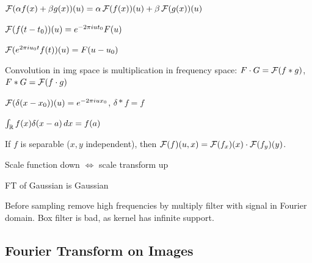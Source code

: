\begin{definition}[Lin.]
  \(\operatorname{\mathcal{F}}(\alpha f(x) + \beta g(x))(u) = \alpha \operatorname{\mathcal{F}}(f(x))(u) + \beta \operatorname{\mathcal{F}}(g(x))(u)\)
\end{definition}

\begin{definition}
  \(\operatorname{\mathcal{F}}(f(t - t_0))(u) = e^{-2 \pi iut_0 } F(u)\)
\end{definition}

\begin{definition}
  \(\operatorname{\mathcal{F}}(e^{2 \pi iu_0t}f(t))(u) = F(u - u_0)\)
\end{definition}

\begin{algorithm}
  Convolution in img space is multiplication in frequency space: \(F \cdot G = \operatorname{\mathcal{F}}(f \ast g)\), \(F \ast G = \operatorname{\mathcal{F}}(f \cdot g)\)
\end{algorithm}

\begin{definition}
  \(\operatorname{\mathcal{F}}(\delta(x - x_0))(u) = e^{-2\pi i u x_0}\), \(\delta \ast f = f\)
\end{definition}

\begin{definition}
  \(\int_{\operatorname{\mathbb{R}}} f(x)\delta(x - a) \,dx = f(a)\)
\end{definition}

\begin{definition}
  If \(f\) is separable (\(x, y\) independent), then \(\operatorname{\mathcal{F}}(f)(u, x) = \operatorname{\mathcal{F}}(f_x)(x) \cdot \operatorname{\mathcal{F}}(f_y)(y)\).
\end{definition}

\begin{definition}
  Scale function down \(\iff\) scale transform up
\end{definition}

\begin{definition}[Gaussian]
  FT of Gaussian is Gaussian
\end{definition}

\begin{definition}[Smoothing]
  Before sampling remove high frequencies by multiply filter with signal in Fourier domain.
  Box filter is bad, as kernel has infinite support.
\end{definition}

\subsection{Fourier Transform on Images}

